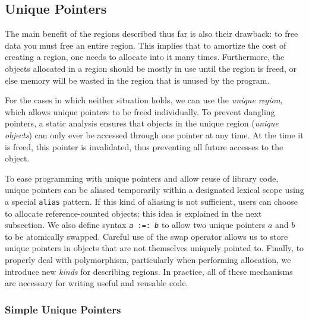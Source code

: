 

\subsection{Unique Pointers}

The main benefit of the regions described thus far is also their drawback:
to free data you must free an entire region.  This implies that to amortize
the cost of creating a region, one needs to allocate into it many times.
Furthermore, the objects allocated in a region should be mostly in use until
the region is freed, or else memory will be wasted in the region that is
unused by the program.

For the cases in which neither situation holds, we can use the \emph{unique
region}, which allows unique pointers to be freed individually.  To prevent
dangling pointers, a static analysis ensures that objects in the unique
region (\emph{unique objects}) can only ever be accessed through one pointer
at any time.  At the time it is freed, this pointer is invalidated, thus
preventing all future accesses to the object.

To ease programming with unique pointers and allow reuse of library code,
unique pointers can be aliased temporarily within a designated lexical scope
using a special \texttt{alias} pattern.  If this kind of aliasing is not
sufficient, users can choose to allocate reference-counted objects; this
idea is explained in the next subsection.  We also define syntax
\texttt{{\it a} :=: {\it b}} to allow two unique pointers $a$ and $b$ to be
atomically swapped.  Careful use of the swap operator allows us to store
unique pointers in objects that are not themselves uniquely pointed to.
Finally, to properly deal with polymorphism, particularly when performing
allocation, we introduce new \emph{kinds} for describing regions.  In
practice, all of these mechanisms are necessary for writing useful and
reusable code.

\subsubsection{Simple Unique Pointers}

